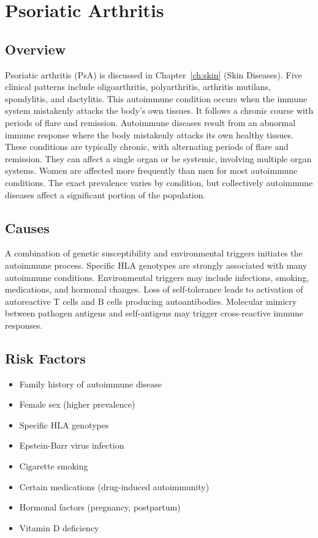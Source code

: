 \chapter{Psoriatic Arthritis}
\label{sec:Psoriatic Arthritis}

\section{Overview}
Psoriatic arthritis (PsA) is discussed in Chapter~\ref{ch:skin} (Skin Diseases). Five clinical patterns include oligoarthritis, polyarthritis, arthritis mutilans, spondylitis, and dactylitis. This autoimmune condition occurs when the immune system mistakenly attacks the body's own tissues. It follows a chronic course with periods of flare and remission. Autoimmune diseases result from an abnormal immune response where the body mistakenly attacks its own healthy tissues. These conditions are typically chronic, with alternating periods of flare and remission. They can affect a single organ or be systemic, involving multiple organ systems. Women are affected more frequently than men for most autoimmune conditions. The exact prevalence varies by condition, but collectively autoimmune diseases affect a significant portion of the population.
\section{Causes}
A combination of genetic susceptibility and environmental triggers initiates the autoimmune process. Specific HLA genotypes are strongly associated with many autoimmune conditions. Environmental triggers may include infections, smoking, medications, and hormonal changes. Loss of self-tolerance leads to activation of autoreactive T cells and B cells producing autoantibodies. Molecular mimicry between pathogen antigens and self-antigens may trigger cross-reactive immune responses.
\section{Risk Factors}

\begin{itemize}[noitemsep]
  \item Family history of autoimmune disease
  \item Female sex (higher prevalence)
  \item Specific HLA genotypes
  \item Epstein-Barr virus infection
  \item Cigarette smoking
  \item Certain medications (drug-induced autoimmunity)
  \item Hormonal factors (pregnancy, postpartum)
  \item Vitamin D deficiency
\end{itemize}

